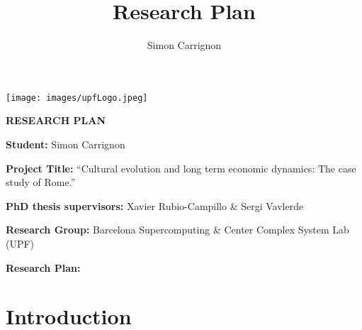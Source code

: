 \documentclass[a4paper]{article}
\title{Research Plan}
\author{Simon Carrignon}
\begin{document}
\vspace{-1cm}
\hspace{-1cm}
\begin{minipage}{.5\textwidth}
	\noindent \texttt{[image: images/upfLogo.jpeg]} 
\end{minipage}
\hfill
\begin{minipage}{.5\textwidth}
    \flushright
	\textbf{ \Large RESEARCH PLAN }
\end{minipage}

	\vspace{3cm}

{

\noindent\textbf{Student:} Simon Carrignon
\vspace{.5cm}

\noindent\textbf{Project Title:} ``Cultural evolution and long term economic dynamics: The case study of Rome.''
\vspace{.5cm}

\noindent\textbf{PhD thesis supervisors:} Xavier Rubio-Campillo \& Sergi Vavlerde
\vspace{.5cm}

\noindent\textbf{Research Group:} Barcelona Supercomputing \& Center Complex System Lab (UPF)  
\vspace{.5cm}

}
\vspace{2cm}

\noindent\textbf{\LARGE Research Plan: }


%
\section*{Introduction}
\end{document}
